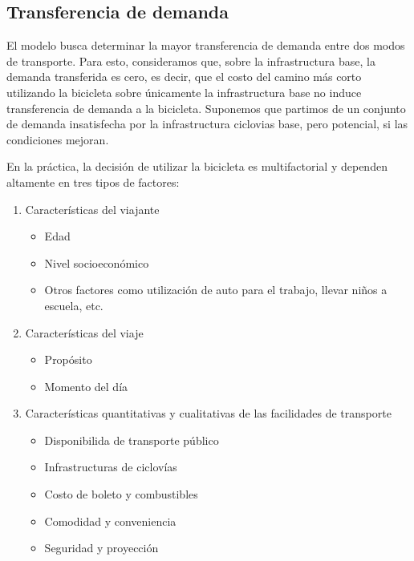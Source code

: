 \documentclass{article}
\begin{document}
  \subsection{Transferencia de demanda}

  El modelo busca determinar la mayor transferencia de demanda entre dos modos de transporte. Para esto, consideramos que, sobre la infrastructura base, la demanda transferida es cero, es decir, que el costo del camino más corto utilizando la bicicleta sobre únicamente la infrastructura base no induce transferencia de demanda a la bicicleta. Suponemos que partimos de un conjunto de demanda insatisfecha por la infrastructura ciclovias base, pero potencial, si las condiciones mejoran.

  En la práctica, la decisión de utilizar la bicicleta es multifactorial y dependen altamente en tres tipos de factores:

  \begin{enumerate}
    \item{
        Características del viajante
          \begin{itemize}
            \item{Edad}
            \item{Nivel socioeconómico}
            \item{Otros factores como utilización de auto para el trabajo, llevar niños a escuela, etc.}
          \end{itemize}
    }
    \item{
        Características del viaje
          \begin{itemize}
            \item{Propósito}
            \item{Momento del día}
          \end{itemize}
    }
    \item{
        Características quantitativas y cualitativas de las facilidades de transporte
        \begin{itemize}
            \item{Disponibilida de transporte público}
            \item{Infrastructuras de ciclovías}
            \item{Costo de boleto y combustibles}
            \item{Comodidad y conveniencia}
            \item{Seguridad y proyección}
        \end{itemize}
    }
  \end{enumerate}
\end{document}
